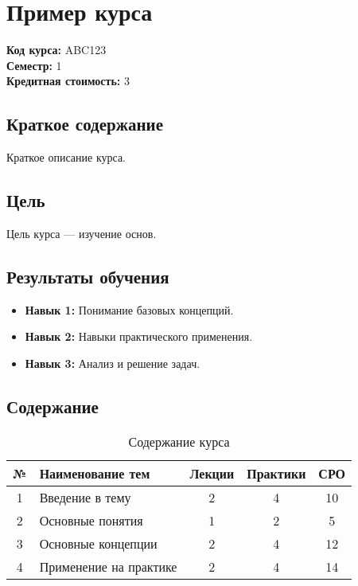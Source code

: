 \documentclass[a4paper,12pt]{article}
\renewcommand{\arraystretch}{1.}
\newcommand{\CourseName}{Пример курса}
\newcommand{\CourseCode}{ABC123}
\newcommand{\Semester}{1}
\newcommand{\Credits}{3}
\newcommand{\CourseDescription}{Краткое описание курса.}
\newcommand{\CourseGoal}{Цель курса — изучение основ.}
\newcommand{\LearningOutcomeOne}{Понимание базовых концепций.}
\newcommand{\LearningOutcomeTwo}{Навыки практического применения.}
\newcommand{\LearningOutcomeThree}{Анализ и решение задач.}
\begin{document}
{\color{darkblue}\section*{\CourseName}}
\begin{tcolorbox}
\textbf{Код курса:} \CourseCode\\
\textbf{Семестр:} \Semester\\
\textbf{Кредитная стоимость:} \Credits
\end{tcolorbox}

\subsection*{Краткое содержание}
\CourseDescription

\subsection*{Цель}
\CourseGoal

\subsection*{Результаты обучения}
\begin{itemize}
    \item \textbf{Навык 1:} \LearningOutcomeOne
    \item \textbf{Навык 2:} \LearningOutcomeTwo
    \item \textbf{Навык 3:} \LearningOutcomeThree
\end{itemize}

\subsection*{Содержание}
\small
\begin{table}[h]
    \centering
    \caption{Содержание курса}
    \renewcommand{\arraystretch}{1.3}
    \begin{tabular}{|c|p{6.5cm}|c|c|c|}
        \hline
        \rowcolor{darkblue!20} 
        \textbf{№} & \textbf{Наименование тем} & \textbf{Лекции} & \textbf{Практики} & \textbf{СРО} \\
        \hline
        1 & Введение в тему & 2 & 4 & 10 \\
        2 & Основные понятия & 1 & 2 & 5 \\
        3 & Основные концепции & 2 & 4 & 12 \\
        4 & Применение на практике & 2 & 4 & 14 \\
        \hline
    \end{tabular}
    \end{table}
\end{document}
